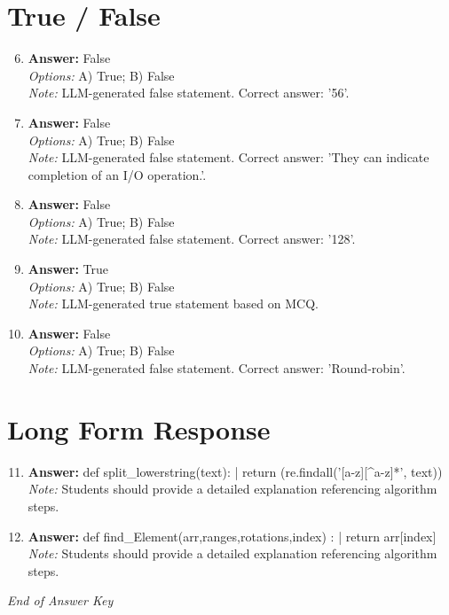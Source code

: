 \documentclass[12pt]{article}
\begin{document}
\section*{True / False}
\begin{enumerate}[label=\arabic*.]
\setcounter{enumi}{5}
\item \textbf{Answer:} False
\\ \textit{Options:} A) True; B) False
\\ \textit{Note:} LLM-generated false statement. Correct answer: '56'.
\item \textbf{Answer:} False
\\ \textit{Options:} A) True; B) False
\\ \textit{Note:} LLM-generated false statement. Correct answer: 'They can indicate completion of an I/O operation.'.
\item \textbf{Answer:} False
\\ \textit{Options:} A) True; B) False
\\ \textit{Note:} LLM-generated false statement. Correct answer: '128'.
\item \textbf{Answer:} True
\\ \textit{Options:} A) True; B) False
\\ \textit{Note:} LLM-generated true statement based on MCQ.
\item \textbf{Answer:} False
\\ \textit{Options:} A) True; B) False
\\ \textit{Note:} LLM-generated false statement. Correct answer: 'Round-robin'.
\end{enumerate}

\section*{Long Form Response}
\begin{enumerate}[label=\arabic*.]
\setcounter{enumi}{10}
\item \textbf{Answer:} def split\_lowerstring(text): | return (re.findall('[a-z][^a-z]*', text))
\\ \textit{Note:} Students should provide a detailed explanation referencing algorithm steps.
\item \textbf{Answer:} def find\_Element(arr,ranges,rotations,index) : | return arr[index]
\\ \textit{Note:} Students should provide a detailed explanation referencing algorithm steps.
\end{enumerate}

\vfill
\noindent\textit{End of Answer Key}
\end{document}

